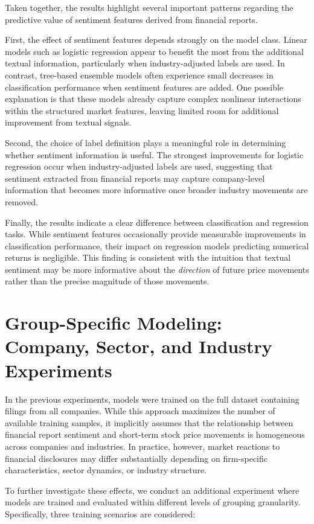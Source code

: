 Taken together, the results highlight several important patterns regarding the predictive value of sentiment features derived from financial reports.

First, the effect of sentiment features depends strongly on the model class. Linear models such as logistic regression appear to benefit the most from the additional textual information, particularly when industry-adjusted labels are used. In contrast, tree-based ensemble models often experience small decreases in classification performance when sentiment features are added. One possible explanation is that these models already capture complex nonlinear interactions within the structured market features, leaving limited room for additional improvement from textual signals.

Second, the choice of label definition plays a meaningful role in determining whether sentiment information is useful. The strongest improvements for logistic regression occur when industry-adjusted labels are used, suggesting that sentiment extracted from financial reports may capture company-level information that becomes more informative once broader industry movements are removed.

Finally, the results indicate a clear difference between classification and regression tasks. While sentiment features occasionally provide measurable improvements in classification performance, their impact on regression models predicting numerical returns is negligible. This finding is consistent with the intuition that textual sentiment may be more informative about the \emph{direction} of future price movements rather than the precise magnitude of those movements.

\section{Group-Specific Modeling: Company, Sector, and Industry Experiments}

In the previous experiments, models were trained on the full dataset containing filings from all companies. While this approach maximizes the number of available training samples, it implicitly assumes that the relationship between financial report sentiment and short-term stock price movements is homogeneous across companies and industries. In practice, however, market reactions to financial disclosures may differ substantially depending on firm-specific characteristics, sector dynamics, or industry structure.

To further investigate these effects, we conduct an additional experiment where models are trained and evaluated within different levels of grouping granularity. Specifically, three training scenarios are considered:

